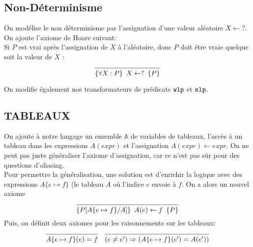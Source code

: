 \documentclass{cours}
\begin{document}
\subsection{Non-Déterminisme}
On modélise le non déterminisme par l'assignation d'une valeur aléatoire $X \gets ?$. 
On ajoute l'axiome de Hoare suivant: \\
Si $P$ est vrai après l'assignation de $X$ à l'aléatoire, donc $P$ doit être vraie quelque soit la valeur de $X$ : 
\begin{equation*}
	\begin{prooftree}
		\infer0{\hoare{\forall X:P}{X \gets ?}{P}}
	\end{prooftree}
\end{equation*}

On modifie également nos transformateurs de prédicats $\texttt{wlp}$ et $\texttt{slp}$. 

\subsection{TABLEAUX}
On ajoute à notre langage un ensemble $\mathbb{A}$ de variables de tableaux, l'accès à un tableau dans les expressions $A(expr)$ et l'assignation $A(expr) \gets expr$.
On ne peut pas juste généraliser l'axiome d'assignation, car ce n'est pas sûr pour des questions d'aliasing.\\
Pour permettre la généralisation, une solution est d'enrichir la logique avec des expressions $A\{e \mapsto f\}$ (le tableau $A$ où l'indice $e$ envoie à $f$. On a alors un nouvel axiome 
\begin{equation*}
	\begin{prooftree}
		\infer0{\hoare{P[A\{e \mapsto f\}/A]}{A(e) \gets f}{P}}
	\end{prooftree}
\end{equation*}
Puis, on définit deux axiomes pour les raisonnements sur les tableaux: 
\begin{equation*}
	\begin{prooftree}
		\infer0{A\{e \mapsto f\}(e) = f}
	\end{prooftree}
	\quad 
	\begin{prooftree}
		\infer0{(e \neq e') \Rightarrow \left(A\{e \mapsto f\}(e') = A(e')\right)}
	\end{prooftree}
\end{equation*}
\end{document}
